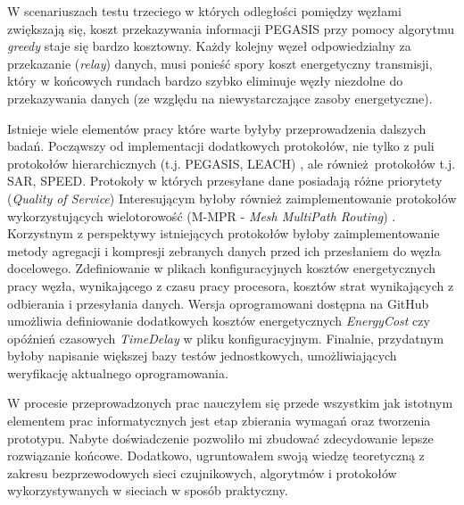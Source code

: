 \documentclass[a4paper,12pt,twoside,openany]{report}
\begin{document}
W scenariuszach testu trzeciego w których odległości pomiędzy węzłami zwiększają się, koszt przekazywania informacji PEGASIS przy pomocy algorytmu \textit{greedy} staje się bardzo kosztowny. 
Każdy kolejny węzeł odpowiedzialny za przekazanie (\textit{relay}) danych, musi ponieść spory koszt energetyczny transmisji, który w końcowych rundach bardzo szybko eliminuje węzły niezdolne do przekazywania danych
(ze względu na niewystarczające zasoby energetyczne).

Istnieje wiele elementów pracy które warte byłyby przeprowadzenia dalszych badań.
Począwszy od implementacji dodatkowych protokołów, nie tylko z puli protokołów hierarchicznych (t.j. PEGASIS, LEACH) \cite{teen-Manjeshwar}, ale również protokołów t.j. SAR, SPEED. Protokoły w których przesyłane dane posiadają różne priorytety (\textit{Quality of Service})
Interesującym byłoby również zaimplementowanie protokołów wykorzystujących wielotorowość (M-MPR - \textit{Mesh MultiPath Routing}) \cite{Sohrab} \cite{Protocols-Sohrabi} \cite{Gao}.
Korzystnym z perspektywy istniejących protokołów byłoby zaimplementowanie metody agregacji i kompresji zebranych danych przed ich przesłaniem do węzła docelowego.
Zdefiniowanie w plikach konfiguracyjnych kosztów energetycznych pracy węzła, wynikającego z czasu pracy procesora, kosztów strat wynikających z odbierania i przesyłania danych.
Wersja oprogramowani dostępna na GitHub umożliwia definiowanie dodatkowych kosztów energetycznych \textit{EnergyCost} \cite{Slijepcevic} czy opóźnień czasowych \textit{TimeDelay} w pliku konfiguracyjnym.
Finalnie, przydatnym byłoby napisanie większej bazy testów jednostkowych, umożliwiających weryfikację aktualnego oprogramowania.

W procesie przeprowadzonych prac nauczyłem się przede wszystkim jak istotnym elementem prac informatycznych jest etap zbierania wymagań oraz tworzenia prototypu.
Nabyte doświadczenie pozwoliło mi zbudować zdecydowanie lepsze rozwiązanie końcowe. 
Dodatkowo, ugruntowałem swoją wiedzę teoretyczną z zakresu bezprzewodowych sieci czujnikowych, algorytmów i protokołów wykorzystywanych w sieciach w sposób praktyczny.


\end{document}
